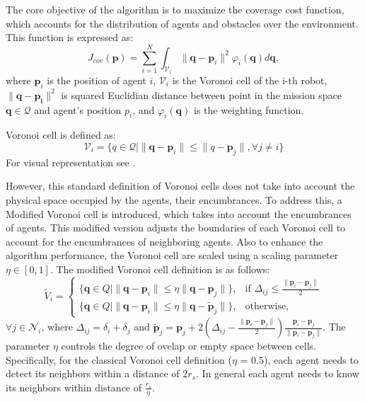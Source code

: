         The core objective of the algorithm is to maximize the coverage cost function, which accounts for the distribution of agents and obstacles over the environment. 
        This function is expressed as:
        \begin{equation}
            J_{cov}(\mathbf{p}) = \sum_{i=1}^{N} \int_{\mathcal{V}_i} \lVert\mathbf{q}-\mathbf{p}_i\rVert^2 \varphi_i (\mathbf{q})d\mathbf{q},
            \label{coverage_cost_function}
        \end{equation}
        where $\mathbf{p}_i$ is the position of agent $i$, $\mathcal{V}_i$ is the Voronoi cell of the i-th robot, $\lVert\mathbf{q}-\mathbf{p_i}\rVert^2$ is squared Euclidian distance between point in the mission space $\mathbf{q} \in \mathcal{Q}$ and agent's position $p_i$, 
        and $\varphi_i (\mathbf{q})$ is the weighting function.

        Voronoi cell is defined as: 
        \begin{equation}
            \mathcal{V}_i = \{q \in \mathcal{Q} \lvert \lVert \mathbf{q} - \mathbf{p}_i \rVert \leq \lVert q - \mathbf{p}_j \rVert, \forall j \neq i\}
        \end{equation}
        For visual representation see . 

        However, this standard definition of Voronoi cells does not take into account the physical space occupied by the agents, their encumbrances. 
        To address this, a Modified Voronoi cell is introduced, which takes into account the encumbrances of agents.
        This modified version adjusts the boundaries of each Voronoi cell to account for the encumbrances of neighboring agents.
        Also to enhance the algorithm performance, the Voronoi cell are scaled using a scaling parameter $\eta \in [0, 1]$.
        The modified Voronoi cell definition is as follows:
        \begin{equation}
            \label{eq:voronoi_cell_account_encum}
            \tilde{V}_i = 
            \begin{cases}
            \{ \mathbf{q} \in Q \mid \| \mathbf{q} - \mathbf{p}_i \| \leq \eta \| \mathbf{q} - \mathbf{p}_j \| \}, & \text{if } \Delta_{ij} \leq \frac{\| \mathbf{p}_i - \mathbf{p}_j \|}{2} \\
            \{ \mathbf{q} \in Q \mid \| \mathbf{q} - \mathbf{p}_i \| \leq \eta \| \mathbf{q} - \tilde{\mathbf{p}}_j \| \}, & \text{otherwise},
            \end{cases}
        \end{equation}
        $\forall j \in \mathcal{N}_i$, where $\Delta_{ij} = \delta_i + \delta_j$ and $\tilde{\mathbf{p}}_j = \mathbf{p}_j + 2(\Delta_{ij} - \frac{\| \mathbf{p}_i - \mathbf{p}_j \|}{2})\frac{ \mathbf{p}_i - \mathbf{p}_j }{\| \mathbf{p}_i - \mathbf{p}_j \|}$.
        The parameter $\eta$ controls the degree of ovelap or empty space between cells.
        Specifically, for the classical Voronoi cell definition ($\eta$ = 0.5), each agent needs to detect its neighbors within a distance of $2r_{s}$.
        In general each agent needs to know its neighbors within distance of $\frac{r_s}{\eta}$.

